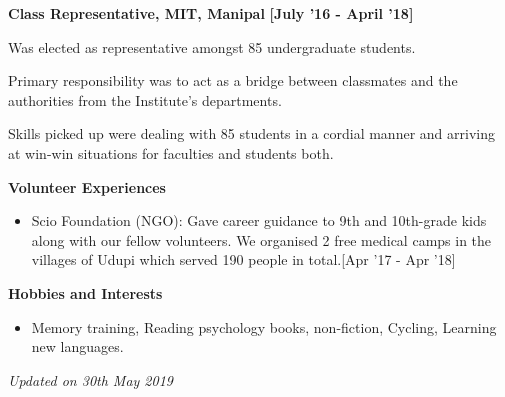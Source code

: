 \documentclass[a4paper,10pt]{article}
\begin{document}
\textbf{Class Representative, MIT, Manipal}  \hfill {\small{{\textbf{[July '16 - April '18]}}}\/}                        
\begin{itemize*}
\item Was elected as representative amongst 85 undergraduate students.
\item Primary responsibility was to act as a bridge between classmates and the authorities from the Institute's departments.
\item Skills picked up were dealing with 85 students in a cordial manner and arriving at win-win situations for faculties and students both.

\end{itemize*}


\colorbox{titleColor}{\parbox{6.7in}{\textbf{Volunteer Experiences}}}

\begin{itemize}
  \setlength{\itemsep}{1pt}
  \item Scio Foundation (NGO):
  Gave career guidance to 9th and 10th-grade kids along with our fellow volunteers. We organised 2 free medical camps in the villages of Udupi which served 190 people in total.\hfill {\small{{[Apr '17 - Apr '18]}}\/} 
\end{itemize}

\colorbox{titleColor}{\parbox{6.7in}{\textbf{Hobbies and Interests}}}

\begin{itemize}
  \setlength{\itemsep}{1pt}
  \item Memory training, Reading psychology books, non-fiction, Cycling, Learning new languages.
\end{itemize}

\textit{Updated on 30th May 2019}
\end{document}
